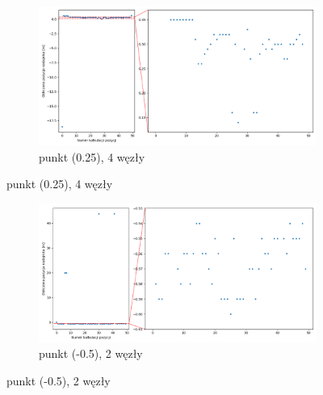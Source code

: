\begin{figure}[H]
    \ContinuedFloat\centering
    \begin{subfigure}{\textwidth}
        \centering
        \includegraphics[width=\linewidth]{pics/mult_lat_1d/position_[0.25]_4.png}
        \caption{punkt (0.25), 4 węzły}
        \label{pic:1d_mult_[0.25]_4}
    \end{subfigure}
\end{figure}
\begin{figure}[H]
    \ContinuedFloat\centering
    \begin{subfigure}{\textwidth}
        \centering
        \includegraphics[width=\linewidth]{pics/mult_lat_1d/position_[-0.5]_2.png}
        \caption{punkt (-0.5), 2 węzły}
        \label{pic:1d_mult_[-0.5]_2}
    \end{subfigure}
\end{figure}
